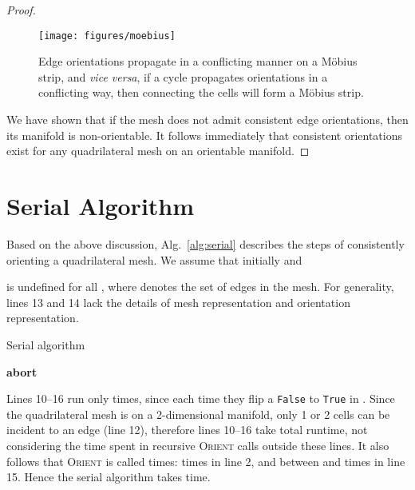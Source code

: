 \documentclass[oneeqnum,onethmnum,onefignum,onetabnum]{siamltex1213}
\begin{document}
\begin{proof}
\begin{figure}
  \centering
  \texttt{[image: figures/moebius]}

  \caption{Edge orientations propagate in a conflicting manner on
    a Möbius strip, and \textit{vice versa}, if a cycle propagates
    orientations in a conflicting way, then connecting the cells will
    form a Möbius strip.}
  \label{fig:moebius_strip}
\end{figure}

We have shown
that if the mesh does not admit consistent edge orientations, then its
manifold is non-orientable. It follows immediately that consistent orientations
exist for any quadrilateral mesh on an orientable manifold.
\end{proof}

\section{Serial Algorithm}
\label{sec:serial}

Based on the above discussion, Alg.~\ref{alg:serial} describes
the steps of consistently orienting a quadrilateral mesh. We assume
that initially  and

is undefined for all , where  denotes the set
of edges in the mesh. For generality, lines 13 and 14 lack the details
of mesh representation and orientation representation.

\begin{algorithm}
  \caption{Serial algorithm}
  \label{alg:serial}
  \begin{algorithmic}[1]
    \ForAll {}
      \State {}
    \EndFor
    \Statex
    \If {}
      \If {}
      \State \textbf{abort}
      \EndIf
    \Else
      \State 
      \State 
      \ForAll {}
        \State 
        \State 
        \State {}
      \EndFor
    \EndIf
    \EndProcedure
  \end{algorithmic}
\end{algorithm}

Lines 10--16 run only  times, since each time they flip
a \texttt{False} to \texttt{True} in . Since the
quadrilateral mesh is on a 2-dimensional manifold, only 1 or 2 cells
can be incident to an edge (line 12), therefore lines 10--16 take
 total runtime, not considering the time spent in recursive
\textsc{Orient} calls outside these lines. It also follows that
\textsc{Orient} is called  times:  times in line 2,
and between  and  times in line 15. Hence the serial
algorithm takes  time.
\end{document}
